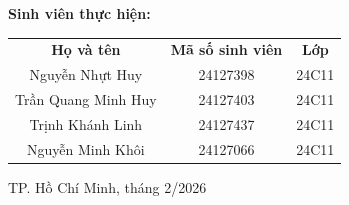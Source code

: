 \begin{titlepage}
\vspace*{0.6cm}
\hspace*{2cm} {\normalsize \textbf{Sinh viên thực hiện:}}
\begin{center}
  \setlength{\tabcolsep}{1.8em}
  {\normalfont
    \renewcommand{\arraystretch}{0.9} %
    \small %
    \begin{tabular}{@{}c c c@{}} %
      \textbf{Họ và tên} & \textbf{Mã số sinh viên} & \textbf{Lớp} \\
            Nguyễn Nhựt Huy    & 24127398 & 24C11 \\
            Trần Quang Minh Huy & 24127403 & 24C11 \\
            Trịnh Khánh Linh & 24127437 & 24C11 \\
            Nguyễn Minh Khôi & 24127066 & 24C11
    \end{tabular}
  }
\end{center}

\vspace*{2.5cm}
  \begin{center}
    TP. Hồ Chí Minh, tháng 2/2026
  \end{center}
\end{titlepage}


